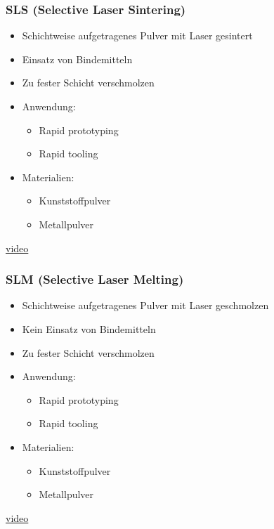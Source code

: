 \begin{frame}
  \frametitle{SLS (Selective Laser Sintering)}
  \pause
  \begin{itemize}
    \item Schichtweise aufgetragenes Pulver mit Laser gesintert \pause
    \item Einsatz von Bindemitteln \pause
    \item Zu fester Schicht verschmolzen \pause
    \item Anwendung:
    \begin{itemize}
      \item Rapid prototyping
      \item Rapid tooling \pause
    \end{itemize}
    \item Materialien:
    \begin{itemize}
      \item Kunststoffpulver
      \item Metallpulver \pause
    \end{itemize}
  \end{itemize}
  \href{https://youtu.be/ruvRijM7f50}{video}
\end{frame}

\begin{frame}
  \frametitle{SLM (Selective Laser Melting)}
  \pause
  \begin{itemize}
    \item Schichtweise aufgetragenes Pulver mit Laser geschmolzen \pause
    \item Kein Einsatz von Bindemitteln \pause
    \item Zu fester Schicht verschmolzen \pause
    \item Anwendung:
    \begin{itemize}
      \item Rapid prototyping
      \item Rapid tooling \pause
    \end{itemize}
    \item Materialien:
    \begin{itemize}
      \item Kunststoffpulver
      \item Metallpulver \pause
    \end{itemize}
  \end{itemize}
  \href{https://youtu.be/yiUUZxp7bLQ}{video}
\end{frame}

